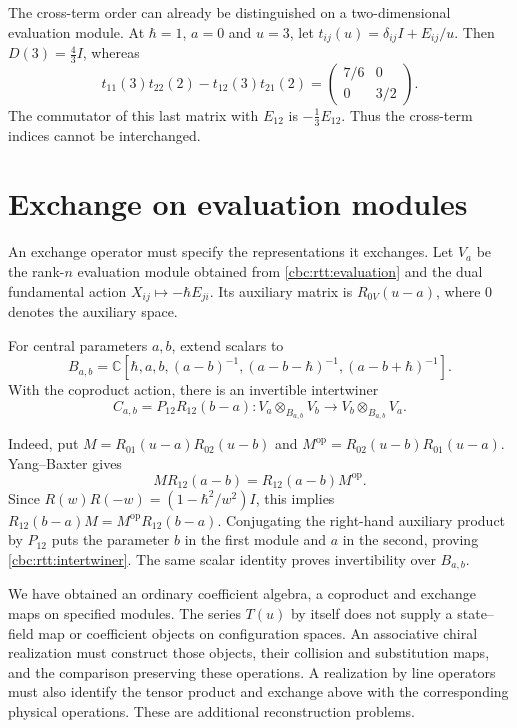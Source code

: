 The cross-term order can already be distinguished on a two-dimensional
evaluation module.  At $\hbar=1$, $a=0$ and $u=3$, let
$t_{ij}(u)=\delta_{ij}I+E_{ij}/u$.  Then $D(3)=\frac43 I$, whereas
\[
 t_{11}(3)t_{22}(2)-t_{12}(3)t_{21}(2)
 =\begin{pmatrix}7/6&0\\0&3/2\end{pmatrix}.
\]
The commutator of this last matrix with $E_{12}$ is
$-\frac13E_{12}$.  Thus the cross-term indices cannot be interchanged.

\section{Exchange on evaluation modules}

An exchange operator must specify the representations it exchanges.
Let $V_a$ be the rank-$n$ evaluation module obtained from
\eqref{cbc:rtt:evaluation} and the dual fundamental action
$X_{ij}\mapsto-\hbar E_{ji}$.  Its auxiliary matrix is
$R_{0V}(u-a)$, where $0$ denotes the auxiliary space.

For central parameters $a,b$, extend scalars to
\[
 B_{a,b}=\mathbb C[\hbar,a,b,(a-b)^{-1},
                          (a-b-\hbar)^{-1},(a-b+\hbar)^{-1}].
\]
With the coproduct action, there is an invertible intertwiner
\begin{equation}\label{cbc:rtt:intertwiner}
 C_{a,b}=P_{12}R_{12}(b-a):
       V_a\otimes_{B_{a,b}}V_b\longrightarrow
       V_b\otimes_{B_{a,b}}V_a.
\end{equation}

Indeed, put $M=R_{01}(u-a)R_{02}(u-b)$ and
$M^{\mathrm{op}}=R_{02}(u-b)R_{01}(u-a)$.
Yang--Baxter gives
\[
 M R_{12}(a-b)=R_{12}(a-b)M^{\mathrm{op}}.
\]
Since $R(w)R(-w)=(1-\hbar^2/w^2)I$, this implies
$R_{12}(b-a)M=M^{\mathrm{op}}R_{12}(b-a)$.
Conjugating the right-hand auxiliary product by $P_{12}$ puts the
parameter $b$ in the first module and $a$ in the second, proving
\eqref{cbc:rtt:intertwiner}.  The same scalar identity proves
invertibility over $B_{a,b}$.

We have obtained an ordinary coefficient algebra, a coproduct and
exchange maps on specified modules.  The series $T(u)$ by itself
does not supply a state--field map or coefficient objects on configuration
spaces.  An associative chiral realization must construct those objects,
their collision and substitution maps, and the comparison preserving
these operations.  A realization by line operators must also identify
the tensor product and exchange above with the corresponding physical
operations.  These are additional reconstruction problems.

